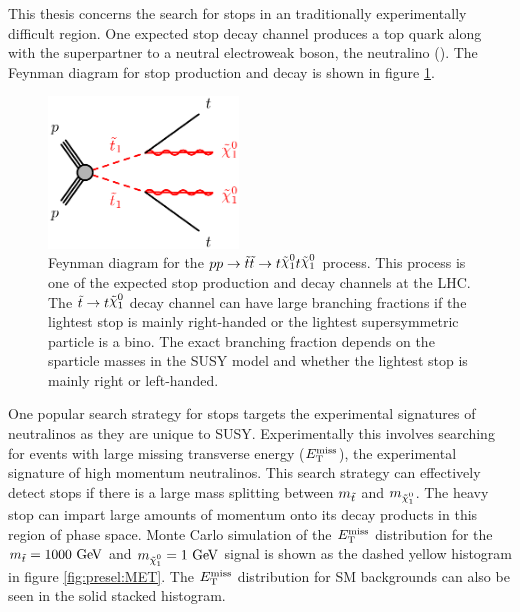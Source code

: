 \indent This thesis concerns the search for stops in an traditionally experimentally difficult region.  One expected stop decay channel produces a top quark along with the superpartner to a neutral electroweak boson, the neutralino (\ninoone).  The Feynman diagram for stop production and decay is shown in figure \ref{fig:stopprod}. \\

\begin{figure}[h!]
\centering
    \includegraphics[width=0.45\textwidth]{figures/feynDiag/stst-tN1tN1.png}\hspace{0.05\textwidth}
\caption[Feynman diagram for the production and decay of stops at the LHC]{ Feynman diagram for the $pp \rightarrow \stop\stop \rightarrow t\ninoone t\ninoone$ process.  This process is one of the expected stop production and decay channels at the LHC.  The $\stop \rightarrow t\ninoone$ decay channel can have large branching fractions if the lightest stop is mainly right-handed or the lightest supersymmetric particle is a bino. The exact branching fraction depends on the sparticle masses in the SUSY model and whether the lightest stop is mainly right or left-handed. }
\label{fig:stopprod}
\end{figure}

\indent One popular search strategy for stops targets the experimental signatures of neutralinos as they are unique to SUSY.  Experimentally this involves searching for events with large missing transverse energy ($E_{\mathrm{T}}^{\mathrm{miss}}$), the experimental signature of high momentum neutralinos.  This search strategy can effectively detect stops if there is a large mass splitting between $m_{\tilde{t}}$ and $m_{\ninoone}$. The heavy stop can impart large amounts of momentum onto its decay products in this region of phase space.  Monte Carlo simulation of the $E_{\mathrm{T}}^{\mathrm{miss}}$ distribution for the $m_{\stop} = 1000 \gev$ and $m_{\ninoone} = 1 \gev$ signal is shown as the dashed yellow histogram in figure \ref{fig:presel:MET}.  The $E_{\mathrm{T}}^{\mathrm{miss}}$ distribution for SM backgrounds can also be seen in the solid stacked histogram.  \\

